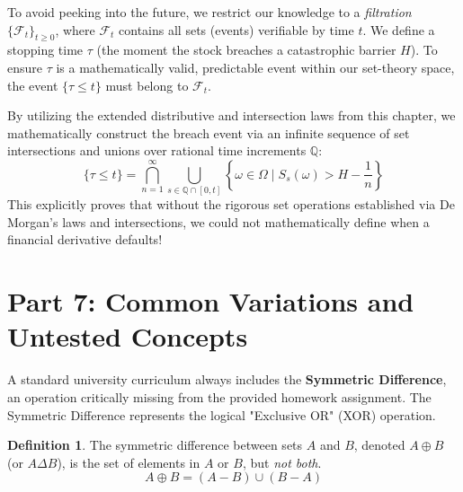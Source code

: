 \documentclass[11pt]{article}
\theoremstyle{definition}
\newtheorem{definition}{Definition}[section]
\begin{document}
To avoid peeking into the future, we restrict our knowledge to a \textit{filtration} $\{\mathcal{F}_t\}_{t \ge 0}$, where $\mathcal{F}_t$ contains all sets (events) verifiable by time $t$. We define a stopping time $\tau$ (the moment the stock breaches a catastrophic barrier $H$). To ensure $\tau$ is a mathematically valid, predictable event within our set-theory space, the event $\{\tau \le t\}$ must belong to $\mathcal{F}_t$. 

By utilizing the extended distributive and intersection laws from this chapter, we mathematically construct the breach event via an infinite sequence of set intersections and unions over rational time increments $\mathbb{Q}$:
\[ \{\tau \le t\} = \bigcap_{n=1}^\infty \bigcup_{s \in \mathbb{Q} \cap [0, t]} \left\{ \omega \in \Omega \mid S_s(\omega) > H - \frac{1}{n} \right\} \]
This explicitly proves that without the rigorous set operations established via De Morgan's laws and intersections, we could not mathematically define when a financial derivative defaults! 

\newpage
\section{Part 7: Common Variations and Untested Concepts}

A standard university curriculum always includes the \textbf{Symmetric Difference}, an operation critically missing from the provided homework assignment. The Symmetric Difference represents the logical "Exclusive OR" (XOR) operation.

\begin{definition}
The symmetric difference between sets $A$ and $B$, denoted $A \oplus B$ (or $A \Delta B$), is the set of elements in $A$ or $B$, but \textit{not both}.
\[ A \oplus B = (A - B) \cup (B - A) \]
\end{definition}
\end{document}
